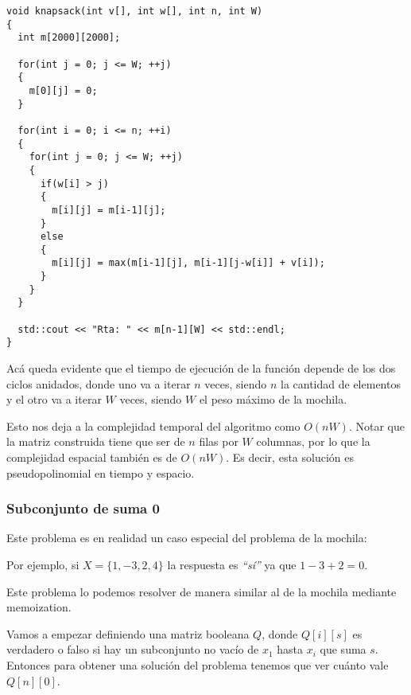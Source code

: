 \begin{center}
\begin{minipage}{1.02\textwidth}
\begin{lstlisting}[frame=lrtb]
void knapsack(int v[], int w[], int n, int W)
{
  int m[2000][2000];
  
  for(int j = 0; j <= W; ++j)
  {
    m[0][j] = 0;
  }

  for(int i = 0; i <= n; ++i)
  {
    for(int j = 0; j <= W; ++j)
    {
      if(w[i] > j)
      {
        m[i][j] = m[i-1][j];
      }
      else
      {
        m[i][j] = max(m[i-1][j], m[i-1][j-w[i]] + v[i]);
      }
    }
  }

  std::cout << "Rta: " << m[n-1][W] << std::endl;
}
\end{lstlisting}
\end{minipage}
\end{center}

Ac\'a queda evidente que el tiempo de ejecuci\'on de la funci\'on depende de los dos ciclos anidados, donde uno va a iterar $n$ veces, siendo $n$ la cantidad de elementos y el otro va a iterar $W$ veces, siendo $W$ el peso m\'aximo de la mochila.

Esto nos deja a la complejidad temporal del algoritmo como $O(nW)$. Notar que la matriz construida tiene que ser de $n$ filas por $W$ columnas, por lo que la complejidad espacial tambi\'en es de $O(nW)$. Es decir, esta soluci\'on es pseudopolinomial en tiempo y espacio.

\newpage
\subsubsection{Subconjunto de suma 0}

Este problema es en realidad un caso especial del problema de la mochila:

\noindent{}

Por ejemplo, si $X = \{1, -3, 2, 4\}$ la respuesta es \emph{``s\'i''} ya que $1 - 3 + 2 = 0$.

Este problema lo podemos resolver de manera similar al de la mochila mediante memoization.

Vamos a empezar definiendo una matriz booleana $Q$, donde $Q[i][s]$ es verdadero o falso si hay un subconjunto no vac\'io de $x_1$ hasta $x_i$ que suma $s$. Entonces para obtener una soluci\'on del problema tenemos que ver cu\'anto vale $Q[n][0]$.

